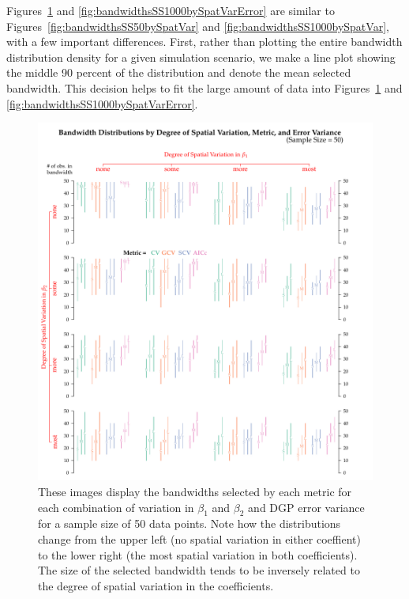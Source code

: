 \documentclass{article}\usepackage{graphicx, color}
\begin{document}
Figures~\ref{fig:bandwidthsSS50bySpatVarError} and \ref{fig:bandwidthsSS1000bySpatVarError} are similar to Figures~\ref{fig:bandwidthsSS50bySpatVar} and \ref{fig:bandwidthsSS1000bySpatVar}, with a few important differences. First, rather than plotting the entire bandwidth distribution density for a given simulation scenario, we make a line plot showing the middle 90 percent of the distribution and denote the mean selected bandwidth. This decision helps to fit the large amount of data into Figures~\ref{fig:bandwidthsSS50bySpatVarError} and \ref{fig:bandwidthsSS1000bySpatVarError}.




\begin{figure}
\centerline{\includegraphics{figure/bandwidthsSS50bySpatVarError.pdf}}
\caption{These images display the bandwidths selected by each metric for each combination of variation in $\beta _1$ and $\beta _2$ and DGP error variance for a sample size of 50 data points. Note how the distributions change from the upper left (no spatial variation in either coeffient) to the lower right (the most spatial variation in both coefficients). The size of the selected bandwidth tends to be inversely related to the degree of spatial variation in the coefficients.}
\label{fig:bandwidthsSS50bySpatVarError}
\end{figure}
\end{document}

